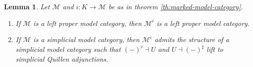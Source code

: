 \documentclass{article}
\newtheorem{lemma}{Lemma}
\theoremstyle{remark}
\theoremstyle{definition}
\begin{document}
\begin{lemma}
  \label{lem:simplicial-marked-objects}
  Let $\mathcal{M}$ and $i : K \rightarrow \mathcal{M}$ be as in theorem \ref{th:marked-model-category}.
  \begin{enumerate}
    \item
      \label{itm:marked-left-proper}
      If $\mathcal{M}$ is a left proper model category, then $\mathcal{M}^i$ is a left proper model category.
    \item
      \label{itm:marked-simplicial}
      If $\mathcal{M}$ is a simplicial model category, then $\mathcal{M}^i$ admits the structure of a simplicial model category such that $(-)^\flat \dashv U$ and $U \dashv (-)^\sharp$ lift to simplicial Quillen adjunctions.
  \end{enumerate}
\end{lemma}
\end{document}
